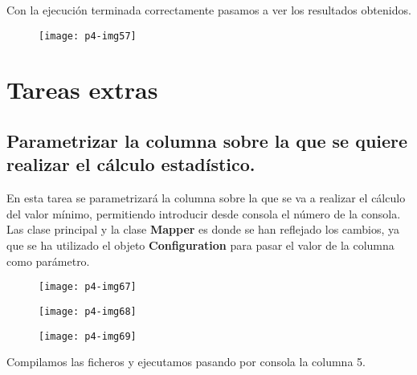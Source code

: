 \documentclass[10pt]{article}
\begin{document}
Con la ejecución terminada correctamente pasamos a ver los resultados obtenidos. \\

\begin{figure}[H]
	\begin{center}
 		\texttt{[image: p4-img57]}
	\end{center} 
\end{figure}


\section{Tareas extras}
\subsection{Parametrizar la columna sobre la que se quiere realizar el cálculo estadístico.}
En esta tarea se parametrizará la columna sobre la que se va a realizar el cálculo del valor mínimo, permitiendo introducir desde consola el número de la consola. Las clase principal y la clase \textbf{Mapper} es donde se han reflejado los cambios, ya que se ha utilizado el objeto \textbf{Configuration} para pasar el valor de la columna como parámetro. \\

\begin{figure}[H]
	\begin{center}
 		\texttt{[image: p4-img67]}
	\end{center} 
\end{figure}

\begin{figure}[H]
	\begin{center}
 		\texttt{[image: p4-img68]}
	\end{center} 
\end{figure}

\begin{figure}[H]
	\begin{center}
 		\texttt{[image: p4-img69]}
	\end{center} 
\end{figure}

Compilamos las ficheros y ejecutamos pasando por consola la columna 5. \\
\end{document}
